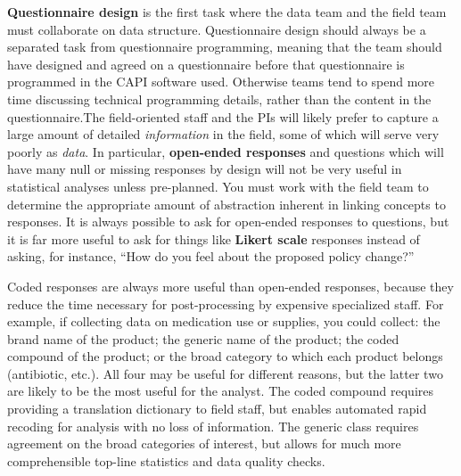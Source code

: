 \textbf{Questionnaire design}
is the first task where the data team
and the field team must collaborate on data structure.
Questionnaire design should always be a separated task from questionnaire programming, meaning
that the team should have designed and agreed on a questionnaire before that questionnaire is
programmed in the CAPI software used. Otherwise teams tend to spend more time discussing technical
programming details, rather than the content in the questionnaire.The field-oriented staff and the
PIs will likely prefer to capture a large amount of detailed \textit{information}
in the field, some of which will serve very poorly as \textit{data}.
In particular, \textbf{open-ended responses} and questions which will have
many null or missing responses by design will not be very useful
in statistical analyses unless pre-planned.
You must work with the field team to determine the appropriate amount
of abstraction inherent in linking concepts to responses.
It is always possible to ask for open-ended responses to questions,
but it is far more useful to ask for things like \textbf{Likert scale} responses
instead of asking, for instance,
``How do you feel about the proposed policy change?''

Coded responses are always more useful than open-ended responses,
because they reduce the time necessary for post-processing by
expensive specialized staff.
For example, if collecting data on medication use or supplies,
you could collect: the brand name of the product;
the generic name of the product;
the coded compound of the product;
or the broad category to which each product belongs (antibiotic, etc.).
All four may be useful for different reasons,
but the latter two are likely to be the most useful for the analyst.
The coded compound requires providing a translation dictionary
to field staff, but enables automated rapid recoding for analysis
with no loss of information.
The generic class requires agreement on the broad categories of interest,
but allows for much more comprehensible top-line statistics and data quality checks.

